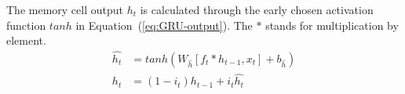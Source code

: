 The memory cell output $h_t$ is calculated through the early chosen activation function $tanh$ in \mbox{Equation~(\ref{eq:GRU-output})}.
The $\ast$ stands for multiplication by element.
\begin{equation}
    \begin{split}
        \hat{h_t} &= tanh \left( W_{\hat{h}} \left[ f_t \ast h_{t-1}, x_t \right] + b_{\hat{h}} \right) \\
        h_t &= \left( 1-i_t \right) h_{t-1}+i_t \hat{h_t}
    \end{split}
    \label{eq:GRU-output}
\end{equation}
%
%
%
